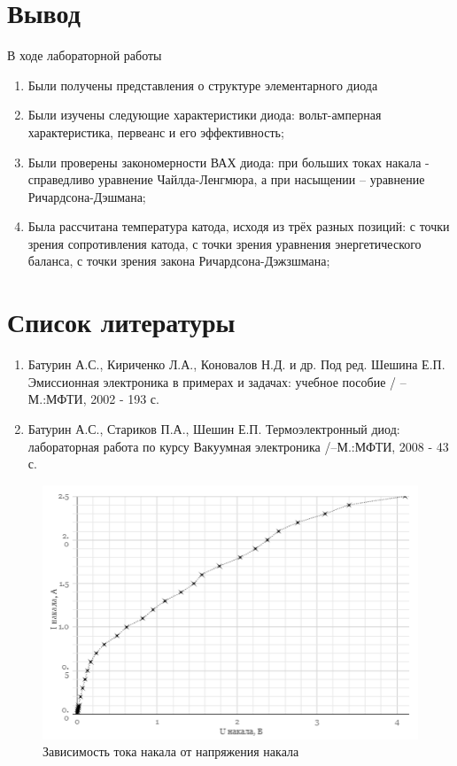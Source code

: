\documentclass[a4paper]{article}
\begin{document}
\section{Вывод}

В ходе лабораторной работы
\begin{enumerate}
    \item Были получены представления о структуре элементарного диода

    \item Были изучены следующие характеристики диода: вольт-амперная характеристика, первеанс и его эффективность;

    \item Были проверены закономерности ВАХ диода: при больших токах накала - справедливо уравнение Чайлда-Ленгмюра, а при насыщении – уравнение Ричардсона-Дэшмана;

    \item Была рассчитана температура катода, исходя из трёх разных позиций: с точки зрения сопротивления катода, с точки зрения уравнения энергетического баланса, с точки зрения закона Ричардсона-Дэжзшмана;

\end{enumerate}

\section{Список литературы}
\begin{enumerate}
    \item Батурин А.С., Кириченко Л.А., Коновалов Н.Д. и др. Под ред. Шешина Е.П. Эмиссионная электроника в примерах и задачах: учебное пособие / --М.:МФТИ, 2002 - 193 с. 
    \item Батурин А.С., Стариков П.А., Шешин Е.П. Термоэлектронный диод: лабораторная работа по курсу Вакуумная электроника /--М.:МФТИ, 2008 - 43 с.
\end{enumerate}

\newpage

\begin{figure}[h]
\begin{center}
\includegraphics[width=13cm]{fig1.PNG}
\caption{Зависимость тока накала от напряжения накала}
\label{ris:experimoriginal} %
\end{center}
\end{figure}
\end{document}
